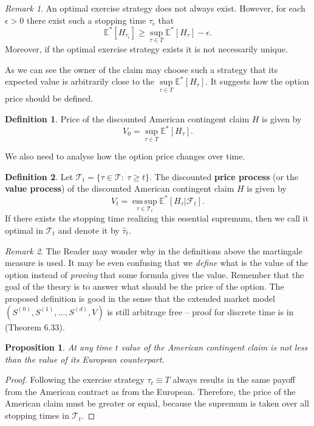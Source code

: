 \documentclass[a4paper,11pt, twoside]{book}
\newtheorem{prop}[thm]{Proposition}
\theoremstyle{definition}
\newtheorem{mydef}{Definition}[chapter]
\theoremstyle{remark}
\newtheorem{remark}{Remark}[chapter]
\def\Em{{\mathbb{E}^*}}
\DeclareMathOperator*{\esssup}{ess\,sup}
\begin{document}
\begin{remark}
 An optimal exercise strategy does not always exist. However, for each $\epsilon > 0$ there exist such a stopping time $\tau_\epsilon$ that
 \[ \Em[H_{\tau_\epsilon}] \geq \sup\limits_{\tau \in T} \Em[H_{\tau}] - \epsilon.\]
 Moreover, if the optimal exercise strategy exists it is not necessarily unique.
\end{remark}
As we can see the owner of the claim may choose such a strategy that its expected value is arbitrarily close to the $\sup\limits_{\tau \in T} \Em[H_{\tau}]$. It suggests how the option price should be defined.
\begin{mydef}
 Price of the discounted American contingent claim $H$ is given by
\begin{equation}
\label{eq:AM_optPrice}
V_0 = \sup\limits_{\tau \in T} \Em[H_{\tau}]. 
\end{equation}
\end{mydef}
We also need to analyse how the option price changes over time.
\begin{mydef}
 \label{def:valueProcess}
 Let  $\mathcal{T}_t = \{ \tau \in \mathcal{T}:\ \tau \geq t \}$. The discounted \textbf{price process} (or the \textbf{value process}) of the  discounted American contingent claim $H$ is given by
\begin{equation}
\label{eq:AM_valueProcess}
V_t = \esssup\limits_{\tau \in  \mathcal{T}_t} \Em[H_{\tau} | \mathcal{F}_t]. 
\end{equation}
 If there exists the stopping time realizing this essential supremum, then we call it optimal in $\mathcal{T}_t$ and denote it by $\hat{\tau}_t$.
\end{mydef}

\begin{remark}
 The Reader may wonder why in the definitions above the martingale measure is used. It may be even confusing that we \emph{define} what is the value of the option instead of \emph{proving} that some formula gives the value. Remember that the goal of the theory is to answer what should be the price of the option. The proposed definition is good in the sense that the extended market model $(S^{(0)}, S^{(1)}, \ldots, S^{(d)}, V)$ is still arbitrage free -- proof for discrete time is in \cite{follmer} (Theorem 6.33).
\end{remark}


\begin{prop}
 At any time $t$ value of the American contingent claim is not less than the value of its European counterpart.
\end{prop}
\begin{proof}
 Following the exercise strategy $\tau_t \equiv T$ always results in the same payoff from the American contract as from the European. Therefore, the price of the American claim must be greater or equal, because the supremum is taken over all stopping times in $\mathcal{T}_t$.
\end{proof}
\end{document}
